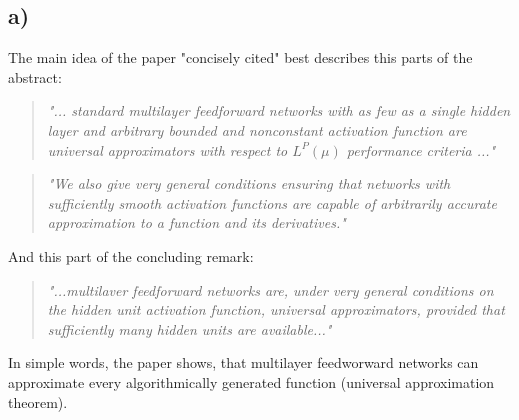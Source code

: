 \documentclass[a4paper]{article}
\begin{document}
    \subsection*{a)}
        The main idea of the paper "concisely cited" best describes this parts of the abstract:
        \begin{quote}
            \textit{"... standard multilayer feedforward networks with as few as a single hidden layer and arbitrary bounded and nonconstant activation function are universal approximators with respect to $L^P(\mu)$ performance criteria ..."}
        \end{quote}
        \begin{quote}
            \textit{"We also give very general conditions ensuring that networks with sufficiently smooth activation functions are capable of arbitrarily accurate approximation to a function and its derivatives."}
        \end{quote}
        And this part of the concluding remark:
        \begin{quote}
            \textit{"...multilaver feedforward networks are, under very general conditions on the hidden unit activation function, universal approximators, provided that sufficiently many hidden units are available..."}
        \end{quote}
        In simple words, the paper shows, that multilayer feedworward networks can approximate every algorithmically generated function (universal approximation theorem).
    
\end{document}
